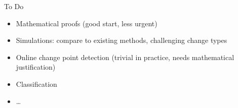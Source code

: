 \documentclass[11pt]{beamer}
\begin{document}
\begin{frame}{To Do}

\begin{itemize}
	\item Mathematical proofs (good start, less urgent)
	\item Simulations: compare to existing methods, challenging change types
	\item Online change point detection (trivial in practice, needs mathematical justification)
	\item Classification
	\item \dots
\end{itemize}

\end{frame}
\end{document}

